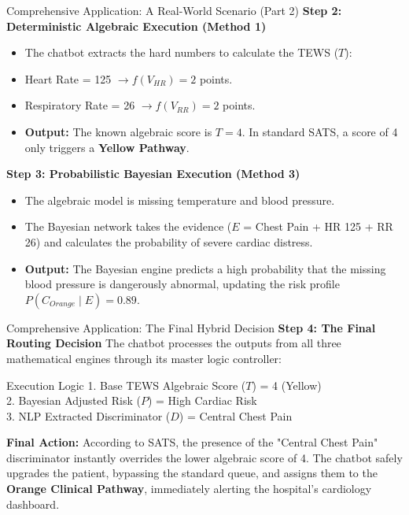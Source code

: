 \documentclass[aspectratio=169]{beamer}
\begin{document}
	\begin{frame}{Comprehensive Application: A Real-World Scenario (Part 2)}
		\textbf{Step 2: Deterministic Algebraic Execution (Method 1)}
		\begin{itemize}
			\item The chatbot extracts the hard numbers to calculate the TEWS ($T$):
			\item Heart Rate = 125 $\rightarrow f(V_{HR}) = 2$ points.
			\item Respiratory Rate = 26 $\rightarrow f(V_{RR}) = 2$ points.
			\item \textbf{Output:} The known algebraic score is $T = 4$. In standard SATS, a score of 4 only triggers a \textcolor{triageyellow}{\textbf{Yellow Pathway}}.
		\end{itemize}
		\vspace{0.3cm}
		\textbf{Step 3: Probabilistic Bayesian Execution (Method 3)}
		\begin{itemize}
			\item The algebraic model is missing temperature and blood pressure.
			\item The Bayesian network takes the evidence ($E$ = Chest Pain + HR 125 + RR 26) and calculates the probability of severe cardiac distress. 
			\item \textbf{Output:} The Bayesian engine predicts a high probability that the missing blood pressure is dangerously abnormal, updating the risk profile $P(C_{Orange} \mid E) = 0.89$.
		\end{itemize}
	\end{frame}
	
	\begin{frame}{Comprehensive Application: The Final Hybrid Decision}
		\textbf{Step 4: The Final Routing Decision}
		The chatbot processes the outputs from all three mathematical engines through its master logic controller:
		\vspace{0.2cm}
		\begin{block}{Execution Logic}
			1. Base TEWS Algebraic Score ($T$) = 4 (\textcolor{triageyellow}{Yellow}) \\
			2. Bayesian Adjusted Risk ($P$) = High Cardiac Risk \\
			3. NLP Extracted Discriminator ($D$) = Central Chest Pain
		\end{block}
		\vspace{0.2cm}
		\textbf{Final Action:} According to SATS, the presence of the "Central Chest Pain" discriminator instantly overrides the lower algebraic score of 4. The chatbot safely upgrades the patient, bypassing the standard queue, and assigns them to the \textcolor{triageorange}{\textbf{Orange Clinical Pathway}}, immediately alerting the hospital's cardiology dashboard.
	\end{frame}
	
\end{document}
